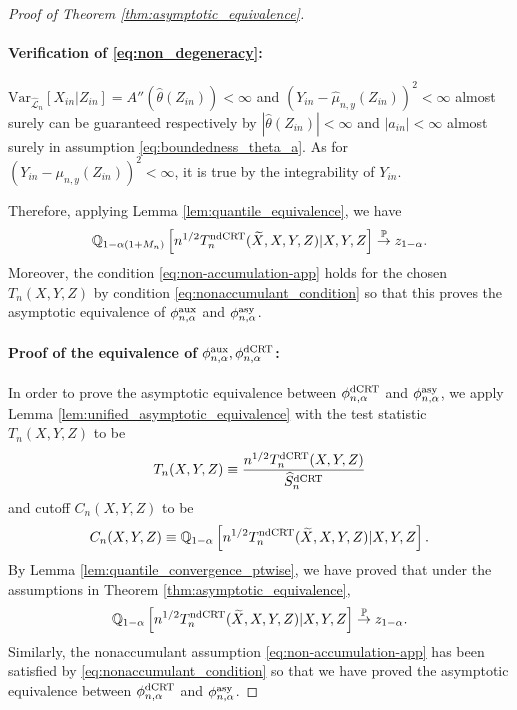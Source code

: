 \documentclass[12pt]{article}
\theoremstyle{definition}
\newcommand{\V}{\mathrm{Var}}							%
\newcommand{\Q}{\mathbb{Q}}								%
\newcommand{\convp}{\overset{\mathbb{P}}{\rightarrow}}             %
\newcommand{\srx}{X}									%
\newcommand{\srz}{Z}									%
\newcommand{\srxk}{\widetilde X}						%
\newcommand{\sry}{Y}									%
\newcommand{\lawhat}{\widehat{\mathcal L}}				%
\newcommand{\dCRT}{\textnormal{dCRT}} 					%
\newcommand{\ndCRThat}{\textnormal{ndCRT}}	%
\newcommand{\aux}{\textnormal{aux}}               %
\newcommand{\asy}{\textnormal{asy}}              %
\begin{document}
\begin{proof}[Proof of Theorem \ref{thm:asymptotic_equivalence}]
  \paragraph{Verification of \eqref{eq:non_degeneracy}:}

  $\V_{\lawhat_n}[\srx_{in}|\srz_{in}]=A''(\widehat{\theta}(\srz_{in}))<\infty$ and $(\sry_{in}-\widehat{\mu}_{n,y}(\srz_{in}))^2<\infty$ almost surely can be guaranteed respectively by $|\widehat{\theta}(\srz_{in})|<\infty$ and $|a_{in}|<\infty$ almost surely in assumption \eqref{eq:boundedness_theta_a}. As for $(\sry_{in}-\mu_{n,y}(\srz_{in}))^2<\infty$, it is true by the integrability of $\sry_{in}$.
  
  \noindent Therefore, applying Lemma \ref{lem:quantile_equivalence}, we have
	  \begin{align*}
		  \Q_{1-\alpha(1+M_n)}\left[n^{1/2}T_n^{\ndCRThat}(\srxk, \srx, \sry,\srz)|\srx,\sry,\srz\right]\convp z_{1-\alpha}.
	\end{align*}
	Moreover, the condition \eqref{eq:non-accumulation-app} holds for the chosen $T_n(\srx,\sry,\srz)$ by condition \eqref{eq:nonaccumulant_condition} so that this proves the asymptotic equivalence of $\phi_{n,\alpha}^{\aux}$ and $\phi_{n,\alpha}^{\asy}$. 
  
	\paragraph{Proof of the equivalence of $\phi_{n,\alpha}^{\aux},\phi_{n,\alpha}^{\dCRT}$:}
  
	In order to prove the asymptotic equivalence between $\phi_{n,\alpha}^{\dCRT}$ and $\phi_{n,\alpha}^{\asy}$, we apply Lemma \ref{lem:unified_asymptotic_equivalence} with the test statistic $T_n(\srx,\sry,\srz)$ to be
	\begin{align*}
	  T_n(\srx,\sry,\srz)\equiv\frac{n^{1/2}T_n^{\dCRT}(\srx,\sry,\srz)}{\widehat{S}_n^{\dCRT}}
	\end{align*}
	and cutoff $C_n(\srx,\sry,\srz)$ to be 
	\begin{align*}
		C_n(\srx,\sry,\srz)\equiv \Q_{1-\alpha}\left[n^{1/2}T_n^{\ndCRThat}(\srxk, \srx, \sry,\srz)|\srx,\sry,\srz\right].
	\end{align*}
	By Lemma \ref{lem:quantile_convergence_ptwise}, we have proved that under the assumptions in Theorem \ref{thm:asymptotic_equivalence}, 
	\begin{align*}
	  \Q_{1-\alpha}\left[n^{1/2}T_n^{\ndCRThat}(\srxk, \srx, \sry,\srz)|\srx,\sry,\srz\right]\convp z_{1-\alpha}.
	\end{align*}
	Similarly, the nonaccumulant assumption \eqref{eq:non-accumulation-app} has been satisfied by \eqref{eq:nonaccumulant_condition} so that we have proved the asymptotic equivalence between $\phi_{n,\alpha}^{\dCRT}$ and $\phi_{n,\alpha}^{\asy}$.
  \end{proof}
\end{document}

